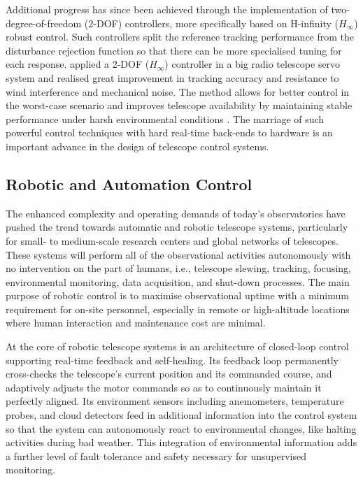     Additional progress has since been achieved through the implementation of two-degree-of-freedom (2-DOF) controllers, more specifically based on H-infinity ($H_\infty$) robust control. Such controllers split the reference tracking performance from the disturbance rejection function so that there can be more specialised tuning for each response. \cite{Yang2023} applied a 2-DOF ($H_\infty$) controller in a big radio telescope servo system and realised great improvement in tracking accuracy and resistance to wind interference and mechanical noise. The method allows for better control in the worst-case scenario and improves telescope availability by maintaining stable performance under harsh environmental conditions \cite{Yang2023}. The marriage of such powerful control techniques with hard real-time back-ends to hardware is an important advance in the design of telescope control systems.

    \subsection{Robotic and Automation Control}
    The enhanced complexity and operating demands of today's observatories have pushed the trend towards automatic and robotic telescope systems, particularly for small- to medium-scale research centers and global networks of telescopes. These systems will perform all of the observational activities autonomously with no intervention on the part of humans, i.e., telescope slewing, tracking, focusing, environmental monitoring, data acquisition, and shut-down processes. The main purpose of robotic control is to maximise observational uptime with a minimum requirement for on-site personnel, especially in remote or high-altitude locations where human interaction and maintenance cost are minimal.

    At the core of robotic telescope systems is an architecture of closed-loop control supporting real-time feedback and self-healing. Its feedback loop permanently cross-checks the telescope's current position and its commanded course, and adaptively adjusts the motor commands so as to continuously maintain it perfectly aligned. Its environment sensors including anemometers, temperature probes, and cloud detectors feed in additional information into the control system so that the system can autonomously react to environmental changes, like halting activities during bad weather. This integration of environmental information adds a further level of fault tolerance and safety necessary for unsupervised monitoring.

